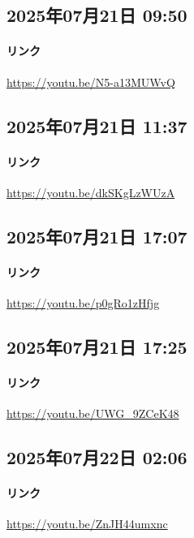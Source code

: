 \subsection*{2025年07月21日 09:50}

\paragraph{リンク}
\url{https://youtu.be/N5-a13MUWvQ}

\subsection*{2025年07月21日 11:37}

\paragraph{リンク}
\url{https://youtu.be/dkSKgLzWUzA}

\subsection*{2025年07月21日 17:07}

\paragraph{リンク}
\url{https://youtu.be/p0gRo1zHfjg}

\subsection*{2025年07月21日 17:25}

\paragraph{リンク}
\url{https://youtu.be/UWG_9ZCeK48}

\subsection*{2025年07月22日 02:06}

\paragraph{リンク}
\url{https://youtu.be/ZnJH44umxnc}

